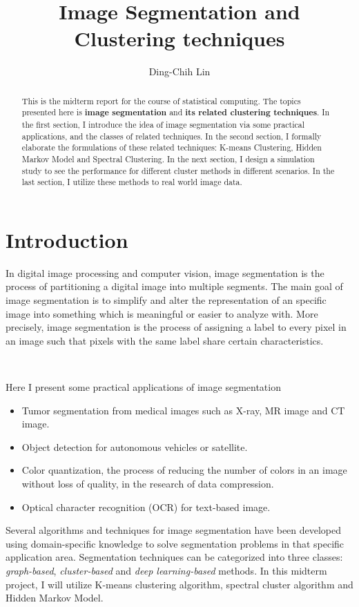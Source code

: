 \documentclass[a4paper]{article}
\title{Image Segmentation and Clustering techniques}
\author{Ding-Chih Lin}
\begin{document}
\maketitle

\begin{abstract}
This is the midterm report for the course of statistical computing. The topics presented here is \textbf{image segmentation} and \textbf{its related clustering techniques}. In the first section, I introduce the idea of image segmentation via some practical applications, and the classes of related techniques. In the second section, I formally elaborate the formulations of these related techniques: K-means Clustering, Hidden Markov Model and Spectral Clustering. In the next section, I design a simulation study to  see the performance for different cluster methods in different scenarios. In the last section, I utilize these methods to real world image data.

\end{abstract}


\section{Introduction}

In digital image processing and computer vision, image segmentation is the process of partitioning a digital image into multiple segments. The main goal of image segmentation is to simplify and alter the representation of an specific image into something which is meaningful or easier to analyze with. More precisely, image segmentation is the process of assigning a label to every pixel in an image such that pixels with the same label share certain characteristics.


\

Here I present some practical applications of image segmentation
\begin{itemize}
	\item Tumor segmentation from medical images such as  X-ray, MR image and CT image.
	\item Object detection for autonomous vehicles or satellite.
	\item Color quantization, the process of reducing the number of colors in an image without loss of quality, in the research of data compression.
	\item Optical character recognition (OCR) for text-based image.
\end{itemize}


Several algorithms and techniques for image segmentation have been developed using domain-specific knowledge to solve segmentation problems in that specific application area. Segmentation techniques can be categorized into three classes: \textit{graph-based}, \textit{cluster-based} and \textit{deep learning-based} methods. In this midterm project, I will utilize K-means clustering algorithm,  spectral cluster algorithm and Hidden Markov Model.
\end{document}
